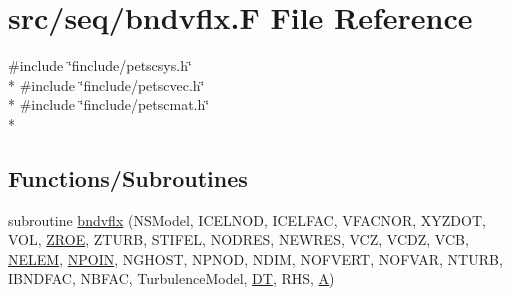 \hypertarget{seq_2bndvflx_8_f}{\section{src/seq/bndvflx.F File Reference}
\label{seq_2bndvflx_8_f}
}
{\ttfamily \#include \char`\"{}finclude/petscsys.\-h\char`\"{}}\\*
{\ttfamily \#include \char`\"{}finclude/petscvec.\-h\char`\"{}}\\*
{\ttfamily \#include \char`\"{}finclude/petscmat.\-h\char`\"{}}\\*
\subsection*{Functions/\-Subroutines}
\begin{DoxyCompactItemize}
\item 
subroutine \hyperlink{seq_2bndvflx_8_f_aea36f7d4f704e528af787b1e57a5e8c1}{bndvflx} (N\-S\-Model, I\-C\-E\-L\-N\-O\-D, I\-C\-E\-L\-F\-A\-C, V\-F\-A\-C\-N\-O\-R, X\-Y\-Z\-D\-O\-T, V\-O\-L, \hyperlink{myts_8com_a0c4fbcdb78e6b50c8919d714e4b5a694}{Z\-R\-O\-E}, Z\-T\-U\-R\-B, S\-T\-I\-F\-E\-L, N\-O\-D\-R\-E\-S, N\-E\-W\-R\-E\-S, V\-C\-Z, V\-C\-D\-Z, V\-C\-B, \hyperlink{mesh_8com_aee5e75b79d0e815c0603cfbccc618957}{N\-E\-L\-E\-M}, \hyperlink{mesh_8com_ae28c1572321efcd8715b974d87d20c58}{N\-P\-O\-I\-N}, N\-G\-H\-O\-S\-T, N\-P\-N\-O\-D, N\-D\-I\-M, N\-O\-F\-V\-E\-R\-T, N\-O\-F\-V\-A\-R, N\-T\-U\-R\-B, I\-B\-N\-D\-F\-A\-C, N\-B\-F\-A\-C, Turbulence\-Model, \hyperlink{myts_8com_a41549d5ede5e2b840495daf35608da41}{D\-T}, R\-H\-S, \hyperlink{ibc2_8com_ad2108d58343608772fff791c23da58f5}{A})
\end{DoxyCompactItemize}


